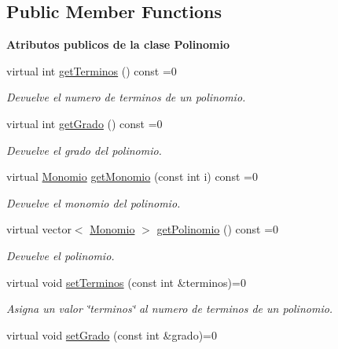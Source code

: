\subsection*{Public Member Functions}
\begin{Indent}{\bf Atributos publicos de la clase Polinomio}\par
\begin{DoxyCompactItemize}
\item 
virtual int \hyperlink{classed_1_1PolinomioInterfaz_ad4d96c242782ff75116e0c1c1d37b680}{get\-Terminos} () const =0
\begin{DoxyCompactList}\small\item\em Devuelve el numero de terminos de un polinomio. \end{DoxyCompactList}\item 
virtual int \hyperlink{classed_1_1PolinomioInterfaz_a7d6b7000f661d225b54486165ad4e6fc}{get\-Grado} () const =0
\begin{DoxyCompactList}\small\item\em Devuelve el grado del polinomio. \end{DoxyCompactList}\item 
virtual \hyperlink{classed_1_1Monomio}{Monomio} \hyperlink{classed_1_1PolinomioInterfaz_a330cdb321988ad4c9110692b8de3dac5}{get\-Monomio} (const int i) const =0
\begin{DoxyCompactList}\small\item\em Devuelve el monomio del polinomio. \end{DoxyCompactList}\item 
virtual vector$<$ \hyperlink{classed_1_1Monomio}{Monomio} $>$ \hyperlink{classed_1_1PolinomioInterfaz_a87be8f97a3338ae8e4b71ffcb2705ca1}{get\-Polinomio} () const =0
\begin{DoxyCompactList}\small\item\em Devuelve el polinomio. \end{DoxyCompactList}\item 
virtual void \hyperlink{classed_1_1PolinomioInterfaz_a7559c60d1b56617ae28b60f359b67fbe}{set\-Terminos} (const int \&terminos)=0
\begin{DoxyCompactList}\small\item\em Asigna un valor \char`\"{}terminos\char`\"{} al numero de terminos de un polinomio. \end{DoxyCompactList}\item 
virtual void \hyperlink{classed_1_1PolinomioInterfaz_a826853f0089f5939ebcd31aa18d6a735}{set\-Grado} (const int \&grado)=0

\end{DoxyCompactItemize}
\end{Indent}
